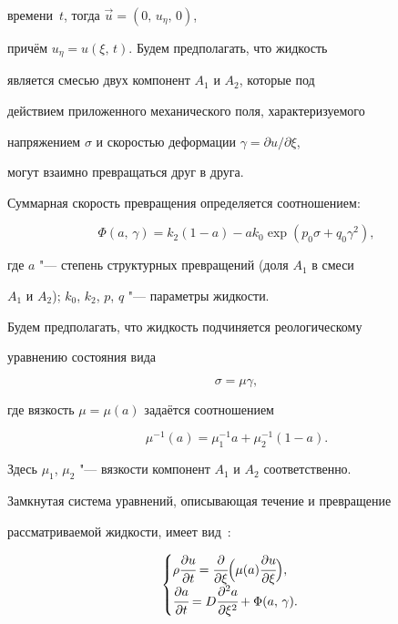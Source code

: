 времени~$t$, тогда $\overrightarrow{u}=(0,\,u_{\eta },\,0)$,

причём $u_{\eta } =u(\xi,\,t)$. Будем предполагать, что жидкость

является смесью двух компонент $A_1$ и $A_2$, которые под

действием приложенного механического поля, характеризуемого

напряжением $\sigma$ и скоростью деформации $\gamma =\partial u/\partial \xi$,


могут взаимно превращаться друг в друга. 

Суммарная скорость превращения определяется соотношением:

\begin{equation}

 \label{belyaeva:phi}

\Phi (a,\,\gamma )=k_{2} (1-a)-ak_0 \exp \left(p_0 \sigma +q_0\gamma^2 \right),

\end{equation}

где $a$ "--- степень структурных превращений (доля $A_1$ в смеси

$A_1$ и $A_2$); $k_0$, $k_2$, $p$, $q$ "--- параметры жидкости.

Будем предполагать, что жидкость подчиняется реологическому

уравнению состояния вида

\begin{equation}

\label{belyaeva:eq1} \sigma =\mu \gamma,

\end{equation}

где вязкость $\mu =\mu (a)$ задаётся соотношением

$$

\mu^{-1}(a)=\mu_1^{-1} a + \mu_2^{-1} (1-a).

$$

Здесь $\mu _1$, $\mu_2$ "--- вязкости компонент $A_1$ и $A_2$ соответственно.



Замкнутая система уравнений, описывающая течение и превращение

рассматриваемой жидкости, имеет вид~\cite{Hud,Bel}:

\begin{equation}

\begin{cases}

\rho\cfrac{\partial u}{\partial t}=\cfrac{\partial }{\partial \xi } \Bigl(\mu (a)\cfrac{\partial u}{\partial \xi } \Bigr),\\

\cfrac{\partial a}{\partial t}=D\cfrac{\partial^2 a}{\partial

\xi^2 } +\Phi (a,\,\gamma). \label{belyaeva:eq2}

\end{cases}

\end{equation}


